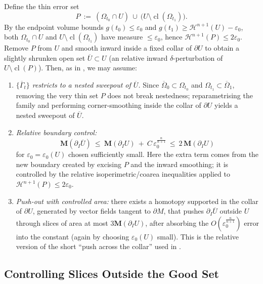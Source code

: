 Define the thin error set
\begin{equation*}
  P \ :=\ (\Omega_{t_0}\cap U)\ \cup\ \bigl(U\setminus \operatorname{cl}(\Omega_{t_1})).
\end{equation*}
By the endpoint volume bounds $g(t_0)\le \varepsilon_0$ and $g(t_1)\ge \mathcal{H}^{n+1}(U)-\varepsilon_0$, both
$\Omega_{t_0}\cap U$ and $U\setminus \operatorname{cl}(\Omega_{t_1})$ have measure $\le \varepsilon_0$, hence
$\mathcal{H}^{n+1}(P)\le 2\varepsilon_0$. Remove $P$ from $U$ and smooth inward inside a fixed collar of $\partial U$
to obtain a slightly shrunken open set $\overline U\subset U$ (an relative inward $\delta$-perturbation of $U\setminus \operatorname{cl}(P)$).
Then, as in \cite[p.~26]{CL20}, we may assume:
\begin{enumerate}
  \item[(i)] \emph{$\{\overline{\Gamma}_t\}$ restricts to a nested sweepout of $\overline U$.}
  Since $\overline\Omega_0\subset \Omega_{t_0}$ and $\Omega_{t_1}\subset \overline\Omega_1$, removing the very thin
  set $P$ does not break nestedness; reparametrising the family and performing corner-smoothing inside the collar of
  $\partial U$ yields a nested sweepout of $\overline U$.
  \item[(ii)] \emph{Relative boundary control:}
  \begin{equation*}
    \mathbf{M}(\partial_I\overline U)
    \ \le\ \mathbf{M}(\partial_IU)\ +\ C\,\varepsilon_0^{\frac{n}{n+1}}
    \ \le\ 2\,\mathbf{M}(\partial_IU)
  \end{equation*}
  for $\varepsilon_0=\varepsilon_0(U)$ chosen sufficiently small. Here the extra term comes from the new boundary
  created by excising $P$ and the inward smoothing; it is controlled by the relative isoperimetric/coarea
  inequalities applied to $\mathcal{H}^{n+1}(P)\le 2\varepsilon_0$.
  \item[(iii)] \emph{Push-out with controlled area:}
  there exists a homotopy supported in the collar of $\partial U$, generated by vector fields tangent to $\partial M$,
  that pushes $\partial_I\overline U$ outside $U$ through slices of area at most $3\mathbf{M}(\partial_IU)$, after absorbing the $O(\varepsilon_0^{\frac{n}{n+1}})$ error into the constant (again by choosing
  $\varepsilon_0(U)$ small). This is the relative version of the short “push across the collar” used in \cite{CL20}.
\end{enumerate}
\subsection{Controlling Slices Outside the Good Set}

